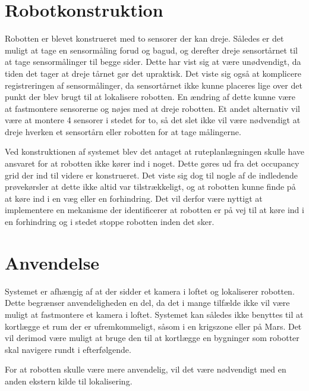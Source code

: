 \section{Robotkonstruktion}
Robotten er blevet konstrueret med to sensorer der kan dreje. 
Således er det muligt at tage en sensormåling forud og bagud, og derefter dreje sensortårnet til at tage sensormålinger til begge sider.
Dette har vist sig at være unødvendigt, da tiden det tager at dreje tårnet gør det upraktisk.
Det viste sig også at komplicere registreringen af sensormålinger, da sensortårnet ikke kunne placeres lige over det punkt der blev brugt til at lokalisere robotten.
En ændring af dette kunne være at fastmontere sensorerne og nøjes med at dreje robotten.
Et andet alternativ vil være at montere 4 sensorer i stedet for to, så det slet ikke vil være nødvendigt at dreje hverken et sensortårn eller robotten for at tage målingerne.

Ved konstruktionen af systemet blev det antaget at ruteplanlægningen skulle have ansvaret for at robotten ikke kører ind i noget. 
Dette gøres ud fra det occupancy grid der ind til videre er konstrueret.
Det viste sig dog til nogle af de indledende prøvekørsler at dette ikke altid var tilstrækkeligt, og at robotten kunne finde på at køre ind i en væg eller en forhindring.
Det vil derfor være nyttigt at implementere en mekanisme der identificerer at robotten er på vej til at køre ind i en forhindring og i stedet stoppe robotten inden det sker. 

\section{Anvendelse}
Systemet er afhængig af at der sidder et kamera i loftet og lokaliserer robotten.
Dette begrænser anvendeligheden en del, da det i mange tilfælde ikke vil være muligt at fastmontere et kamera i loftet.
Systemet kan således ikke benyttes til at kortlægge et rum der er ufremkommeligt, såsom i en krigszone eller på Mars.
Det vil derimod være muligt at bruge den til at kortlægge en bygninger som robotter skal navigere rundt i efterfølgende.

For at robotten skulle være mere anvendelig, vil det være nødvendigt med en anden ekstern kilde til lokalisering.